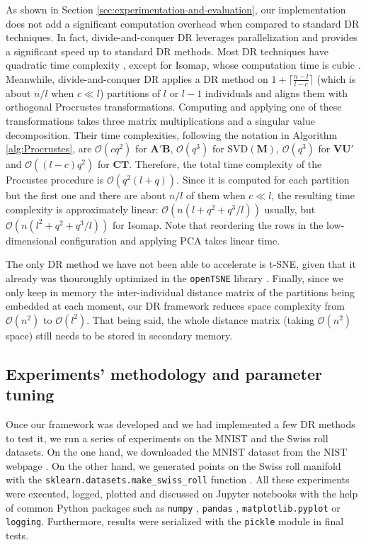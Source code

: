 As shown in Section \ref{sec:experimentation-and-evaluation}, our implementation does not add a significant computation overhead when compared to standard DR techniques. In fact, divide-and-conquer DR leverages parallelization and provides a significant speed up to standard DR methods. Most DR techniques have quadratic time complexity \citep{Kruskal1964a,Kruskal1964b,Chen2009, Vandermaaten2008}, except for Isomap, whose computation time is cubic \citep{Tenenbaum2000}. Meanwhile, divide-and-conquer DR applies a DR method on $1 + \lceil \frac{n - l}{l - c} \rceil$ (which is about $n/l$ when $c \ll l$) partitions of $l$ or $l-1$ individuals and aligns them with orthogonal Procrustes transformations. Computing and applying one of these transformations takes three matrix multiplications and a singular value decomposition. Their time complexities, following the notation in Algorithm \ref{alg:Procrustes}, are $\mathcal{O}(cq^2)$ for $\mathbf{A}' \mathbf{B}$, $\mathcal{O}(q^3)$ for $\text{SVD}(\mathbf{M})$, $\mathcal{O}(q^3)$ for $\mathbf{V} \mathbf{U}'$ and $\mathcal{O}((l-c)q^2)$ for $\mathbf{CT}$. Therefore, the total time complexity of the Procustes procedure is $\mathcal{O}(q^2(l+q))$. Since it is computed for each partition but the first one and there are about $n/l$ of them when $c \ll l$, the resulting time complexity is approximately linear: $\mathcal{O}(n(l + q^2 + q^3/l))$ usually, but $\mathcal{O}(n(l^2 + q^2 + q^3/l))$ for Isomap. Note that reordering the rows in the low-dimensional configuration and applying PCA takes linear time.

The only DR method we have not been able to accelerate is t-SNE, given that it already was thouroughly optimized in the \verb|openTSNE| library \citep{Policar2024}. Finally, since we only keep in memory the inter-individual distance matrix of the partitions being embedded at each moment, our DR framework reduces space complexity from $\mathcal{O}(n^2)$ to $\mathcal{O}(l^2)$. That being said, the whole distance matrix (taking $\mathcal{O}(n^2)$ space) still needs to be stored in secondary memory.


\subsection{Experiments' methodology and parameter tuning}
\label{sec:experiment-methodology-parameter-tuning}

Once our framework was developed and we had implemented a few DR methods to test it, we run a series of experiments on the MNIST \citep{Cohen2017} and the Swiss roll \citep{Tenenbaum2000} datasets. On the one hand, we downloaded the MNIST dataset from the NIST webpage \citep{NIST2024}. On the other hand, we generated points on the Swiss roll manifold with the \verb|sklearn.datasets.make_swiss_roll| function \citep{Pedregosa2011}. All these experiments were executed, logged, plotted and discussed on Jupyter notebooks \citep{Kluyver2016} with the help of common Python packages such as \verb|numpy| \citep{Harris2020}, \verb|pandas| \citep{Mckinney2010}, \verb|matplotlib.pyplot| \citep{Hunter2007} or \verb|logging|. Furthermore, results were serialized with the \verb|pickle| module in final tests.

